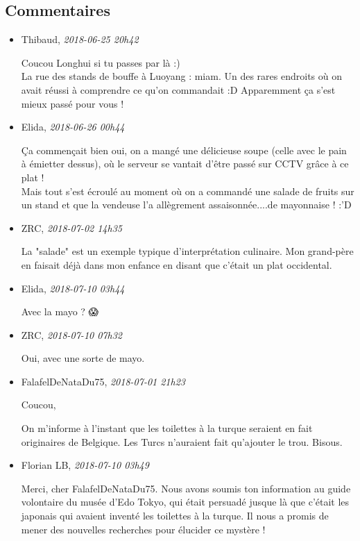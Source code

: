 \documentclass[]{article}
\date{}
\begin{document}
\hypertarget{commentaires}{%
\subsection{Commentaires}\label{commentaires}}

\begin{itemize}
\item
  Thibaud, \emph{2018-06-25 20h42}

  Coucou Longhui si tu passes par là :)\\
  La rue des stands de bouffe à Luoyang : miam. Un des rares endroits où
  on avait réussi à comprendre ce qu'on commandait :D Apparemment ça
  s'est mieux passé pour vous !
\item
  Elida, \emph{2018-06-26 00h44}

  Ça commençait bien oui, on a mangé une délicieuse soupe (celle avec le
  pain à émietter dessus), où le serveur se vantait d'être passé sur
  CCTV grâce à ce plat !\\
  Mais tout s'est écroulé au moment où on a commandé une salade de
  fruits sur un stand et que la vendeuse l'a allègrement
  assaisonnée....de mayonnaise ! :'D
\item
  ZRC, \emph{2018-07-02 14h35}

  La "salade" est un exemple typique d'interprétation culinaire. Mon
  grand-père en faisait déjà dans mon enfance en disant que c'était un
  plat occidental.
\item
  Elida, \emph{2018-07-10 03h44}

  Avec la mayo ? 😱
\item
  ZRC, \emph{2018-07-10 07h32}

  Oui, avec une sorte de mayo.
\item
  FalafelDeNataDu75, \emph{2018-07-01 21h23}

  Coucou,

  On m'informe à l'instant que les toilettes à la turque seraient en
  fait originaires de Belgique. Les Turcs n'auraient fait qu'ajouter le
  trou. Bisous.
\item
  Florian LB, \emph{2018-07-10 03h49}

  Merci, cher FalafelDeNataDu75. Nous avons soumis ton information au
  guide volontaire du musée d'Edo Tokyo, qui était persuadé jusque là
  que c'était les japonais qui avaient inventé les toilettes à la
  turque. Il nous a promis de mener des nouvelles recherches pour
  élucider ce mystère !
\end{itemize}
\end{document}
